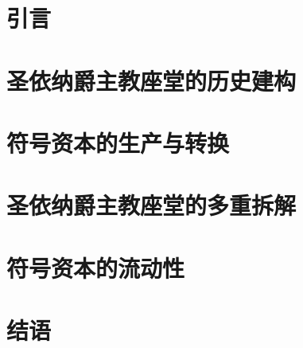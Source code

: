 \documentclass[
    lang=cn,
]{spArticle}
\date{}
\begin{document}
    \section{引言}
    \lipsum[1]

    \section{圣依纳爵主教座堂的历史建构}
    \lipsum[2]

    \section{符号资本的生产与转换}
    \lipsum[3]

    \section{圣依纳爵主教座堂的多重拆解}
    \lipsum[4]

    \section{符号资本的流动性}
    \lipsum[5]

    \section{结语}
    \lipsum[6]
\end{document}
